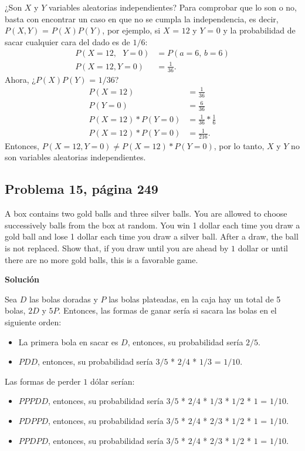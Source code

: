 \documentclass{article}
\begin{document}
¿Son $X$ y $Y$ variables aleatorias independientes? Para comprobar que lo son o no, basta con encontrar un caso en que no se cumpla la independencia, es decir, $P(X,Y)$ = $P(X)P(Y)$, por ejemplo, si $X$ = $12$ y $Y$ = $0$ y la probabilidad de sacar cualquier cara del dado es de $1/6$:
\begin{align}
    \nonumber
    P{(X=12, \text{ } Y=0)} & = P{(a=6, \, b=6)} \\ \nonumber
    P{(X=12, Y=0)} & = \frac{1}{36}.
\end{align}
Ahora, ¿$P(X)P(Y)$ = $1/36$?
\begin{align}
    \nonumber
    P{(X=12)} & = \frac{1}{36} \\ \nonumber
    P{(Y=0)}  & = \frac{6}{36} \\ \nonumber
    P{(X=12)}*P{(Y=0)} & = \frac{1}{36} * \frac{1}{6} \\ \nonumber
    P{(X=12)}*P{(Y=0)} & = \frac{1}{216}.
\end{align}
Entonces, $P{(X=12, Y=0)} \neq P{(X=12)}*P{(Y=0)}$, por lo tanto, $X$ y $Y$ no son variables aleatorias independientes.

\subsection{Problema 15, página 249}
A box contains two gold balls and three silver balls. You are allowed to choose successively balls from the box at random. You win 1 dollar each time you draw a gold ball and lose 1 dollar each time you draw a silver ball. After a draw, the ball is not replaced. Show that, if you draw until you are ahead by $1$ dollar or until there are no more gold balls, this is a favorable game.

\noindent \textbf{Solución}

\noindent Sea $D$ las bolas doradas y $P$ las bolas plateadas, en la caja hay un total de 5 bolas, $2D$ y $5P$. Entonces, las formas de ganar sería si sacara las bolas en el siguiente orden:
\begin{itemize}
    \item La primera bola en sacar es $D$, entonces, su probabilidad sería $2/5$.
    \item $PDD$, entonces, su probabilidad sería $3/5$ * $2/4$ * $1/3$ = $1/10$. 
\end{itemize}
Las formas de perder $1$ dólar serían:
\begin{itemize}
    \item $PPPDD$, entonces, su probabilidad sería $3/5$ * $2/4$ * $1/3$ * $1/2$ * $1$ = $1/10$.
    \item $PDPPD$, entonces, su probabilidad sería $3/5$ * $2/4$ * $2/3$ * $1/2$ * $1$ = $1/10$.
    \item $PPDPD$, entonces, su probabilidad sería $3/5$ * $2/4$ * $2/3$ * $1/2$ * $1$ = $1/10$.
\end{itemize}
\end{document}
